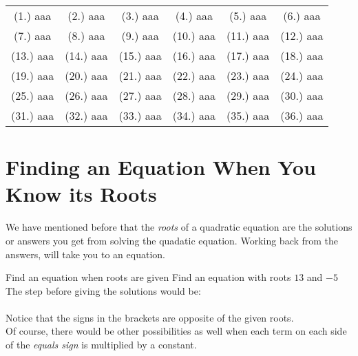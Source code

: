 {%
\par \practiceinfo
\par \begin{tabular}[h]{cccccc}
(1.)	aaa	&
(2.)	aaa	&
(3.)	aaa	&
(4.)	aaa	&
(5.)	aaa	&
(6.)	aaa	\\ %
(7.)	aaa	&
(8.)	aaa	&
(9.)	aaa	&
(10.)	aaa	&
(11.)	aaa	&
(12.)	aaa	\\ %
(13.)	aaa	&
(14.)	aaa	&
(15.)	aaa	&
(16.)	aaa	&
(17.)	aaa	&
(18.)	aaa	\\ %
(19.)	aaa	&
(20.)	aaa	&
(21.)	aaa	&
(22.)	aaa	&
(23.)	aaa	&
(24.)	aaa	\\ %
(25.)	aaa	&
(26.)	aaa	&
(27.)	aaa	&
(28.)	aaa	&
(29.)	aaa	&
(30.)	aaa	\\ %
(31.)	aaa	&
(32.)	aaa	&
(33.)	aaa	&
(34.)	aaa	&
(35.)	aaa	&
(36.)	aaa %
\end{tabular}}

\section{Finding an Equation When You Know its Roots}

We have mentioned before that the \textit{roots} of a quadratic equation are the solutions or answers you get from solving the quadatic equation.  Working back from the answers, will take you to an equation.

\begin{wex}{Find an equation when roots are given}
{Find an equation with roots $13$ and $-5$\\}{
The step before giving the solutions would be:\\
\\
Notice that the signs in the brackets are opposite of the given roots.\\
Of course, there would be other possibilities as well when each term on each side of the \textit{equals sign} is multiplied by a constant.}
\end{wex}

